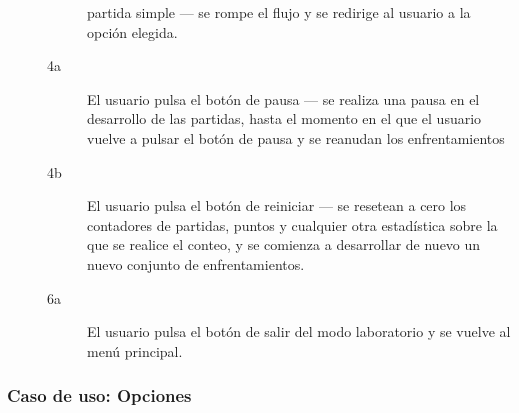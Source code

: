 \begin{description}
\begin{description}
                    partida simple --- se rompe el flujo y se redirige al usuario a la opción elegida.
            \item[4a ] El usuario pulsa el botón de pausa --- se realiza una pausa en el desarrollo de las
                    partidas, hasta el momento en el que el usuario vuelve a pulsar el botón de pausa y se
                    reanudan los enfrentamientos
            \item[4b ] El usuario pulsa el botón de reiniciar --- se resetean a cero los contadores de partidas,
                    puntos y cualquier otra estadística sobre la que se realice el conteo, y se comienza a
                    desarrollar de nuevo un nuevo conjunto de enfrentamientos.
            \item[6a ] El usuario pulsa el botón de salir del modo laboratorio y se vuelve al menú principal.
        \end{description}
\end{description}

\subsubsection{Caso de uso: Opciones}


